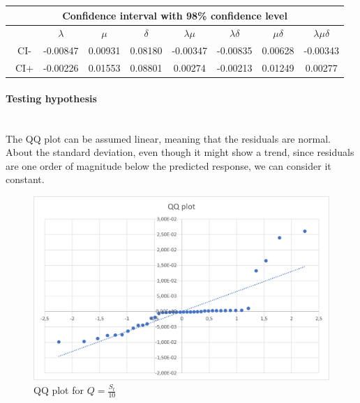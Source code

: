 \documentclass{article}
\begin{document}
                    \begin{table}[htbp]
                        \begin{tabular}{|c|c|c|c|c|c|c|c|}
                        
                             \hline
                             \multicolumn{8}{|c|}{\bf Confidence interval with 98\% confidence level} \\
                                
                            \hline
                            \ & $\lambda$ & $\mu$ & $\delta$ & $\lambda\mu$ & $\lambda\delta$ & $\mu\delta$ & $\lambda\mu\delta$\\
                            \hline
                            \ CI- & -0.00847 & 0.00931 & 0.08180 & -0.00347 & -0.00835 & 0.00628 & -0.00343 \\ 
                            \hline
                            \ CI+ & -0.00226 & 0.01553 & 0.08801 & 0.00274 & -0.00213 & 0.01249 & 0.00277 \\ 
                            \hline
                        \end{tabular}
                        \label{table:CI_0,1}
                    \end{table}
                
                \paragraph{Testing hypothesis} \hfill \\
                The QQ plot can be assumed linear, meaning that the residuals are normal. About the standard deviation, even though it might show a trend, since residuals are one order of magnitude below the predicted response, we can consider it constant.
                
                    \begin{figure}[htbp]
                        \centering
                        \includegraphics[scale=0.7]{images/QQplot_0,1.png}
                        \caption{QQ plot for $Q = \frac{S_t}{10}$}
                        \label{fig:QQplot_0,1}
                    \end{figure}
                    
\end{document}

